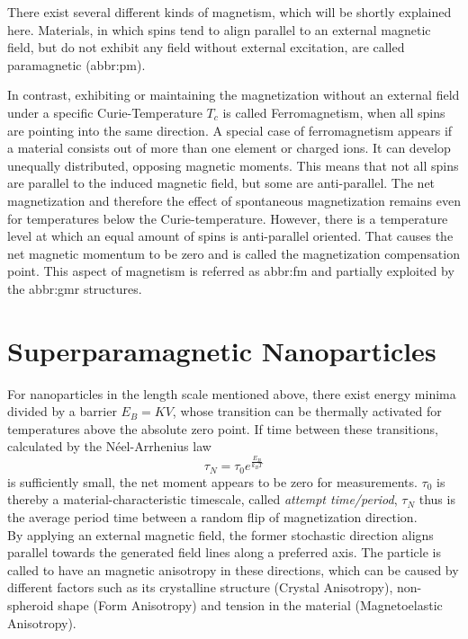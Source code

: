 There exist several different kinds of magnetism, which will be shortly explained here.
Materials, in which spins tend to align parallel to an external magnetic field, but do not exhibit any field without external excitation, are called paramagnetic (\acrshort{abbr:pm}).\cite{lit:nano:physicsmagneticmaterials}

In contrast, exhibiting or maintaining the magnetization without an external field under a specific Curie-Temperature $T_c$ is called Ferromagnetism, when all spins are pointing into the same direction. A special case of ferromagnetism appears if a material consists out of more than one element or charged ions. It can develop unequally distributed, opposing magnetic moments. This means that not all spins are parallel to the induced magnetic field, but some are anti-parallel. The net magnetization and therefore the effect of spontaneous magnetization remains even for temperatures below the Curie-temperature. However, there is a temperature level at which an equal amount of spins is anti-parallel oriented. That causes the net magnetic momentum to be zero and is called the magnetization compensation point. This aspect of magnetism is referred as \acrlong{abbr:fm} and partially exploited by the \acrshort{abbr:gmr} structures.\cite{lit:nano:transport_ferromagnet}

\newpage
\section{Superparamagnetic Nanoparticles}
\label{sec:nano:particles}
For nanoparticles in the length scale mentioned above, there exist energy minima divided by a barrier $E_B = KV$, whose transition can be thermally activated for temperatures above the absolute zero point.\cite{lit:nano:applications} If time between these transitions, calculated by the N\'{e}el-Arrhenius law
\begin{equation}
\tau_N = \tau_0e^{\frac{E_B}{k_BT}}
\label{eq:nano:neel-arrhenius}
\end{equation} is sufficiently small, the net moment appears to be zero for measurements.\cite{lit:nano:Guimares2017} $\tau_0$ is thereby a material-characteristic timescale, called \textit{attempt time/period}, $\tau_N$ thus is the average period time between a random flip of magnetization direction.\\
By applying an external magnetic field, the former stochastic direction aligns parallel towards the generated field lines along a preferred axis. The particle is called to have an magnetic anisotropy in these directions, which can be caused by different factors such as its crystalline structure (Crystal Anisotropy), non-spheroid shape (Form Anisotropy) and tension in the material (Magnetoelastic Anisotropy).\cite{lit:nano:nanoparticle_magnetism} 

